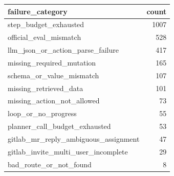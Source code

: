 \begin{tabular}{lr}
\toprule
failure_category & count \\
\midrule
step_budget_exhausted & 1007 \\
official_eval_mismatch & 528 \\
llm_json_or_action_parse_failure & 417 \\
missing_required_mutation & 165 \\
schema_or_value_mismatch & 107 \\
missing_retrieved_data & 101 \\
missing_action_not_allowed & 73 \\
loop_or_no_progress & 55 \\
planner_call_budget_exhausted & 53 \\
gitlab_mr_reply_ambiguous_assignment & 47 \\
gitlab_invite_multi_user_incomplete & 29 \\
bad_route_or_not_found & 8 \\
\bottomrule
\end{tabular}

